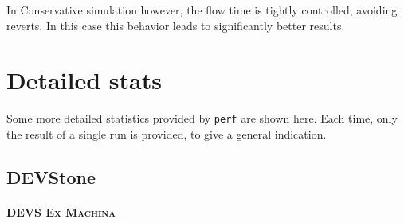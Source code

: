 \documentclass[8pt,a4paper]{report}
\begin{document}
In Conservative simulation however, the flow time is tightly controlled, avoiding reverts. In this case this behavior leads to significantly better results.

\pagebreak

\section{Detailed stats}
Some more detailed statistics provided by \texttt{perf} are shown here. Each time, only the result of a single run is provided, to give a general indication.

\subsection{DEVStone}
\paragraph{\textsc{DEVS Ex Machina}}
\end{document}
